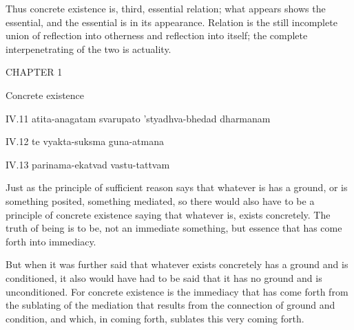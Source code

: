 Thus concrete existence is, third, essential relation;
what appears shows the essential,
and the essential is in its appearance.
Relation is the still incomplete union of
reflection into otherness and reflection into itself;
the complete interpenetrating of the two is actuality.

CHAPTER 1

Concrete existence

IV.11
atita-anagatam svarupato 'styadhva-bhedad dharmanam

IV.12
te vyakta-suksma guna-atmana

IV.13
parinama-ekatvad vastu-tattvam

Just as the principle of sufficient reason says
that whatever is has a ground,
or is something posited, something mediated,
so there would also have to be
a principle of concrete existence saying
that whatever is, exists concretely.
The truth of being is to be,
not an immediate something,
but essence that has
come forth into immediacy.

But when it was further said
that whatever exists concretely
has a ground and is conditioned,
it also would have had to be said
that it has no ground and is unconditioned.
For concrete existence is the immediacy
that has come forth from the sublating
of the mediation that results
from the connection of ground and condition,
and which, in coming forth,
sublates this very coming forth.

